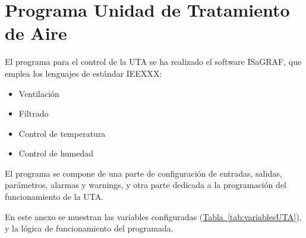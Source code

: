 
\cleardoublepage
\chapter{Programa Unidad de Tratamiento de Aire}

\label{chap:anexoProgramaUTA} %

El programa para el control de la UTA se ha realizado el software ISaGRAF, que emplea los lenguajes de estándar IEEXXX:                   

\begin{itemize}
    \item Ventilación
    \item Filtrado
    \item Control de temperatura
    \item Control de humedad
\end{itemize}

El programa se compone de una parte de configuración de entradas, salidas, parámetros, alarmas y warnings, y otra parte dedicada a la programación del funcionamiento de la UTA.

En este anexo se muestran las variables configuradas (\hyperref[tab:variablesUTA]{Tabla~\ref{tab:variablesUTA}}), y la lógica de funcionamiento del programada.

